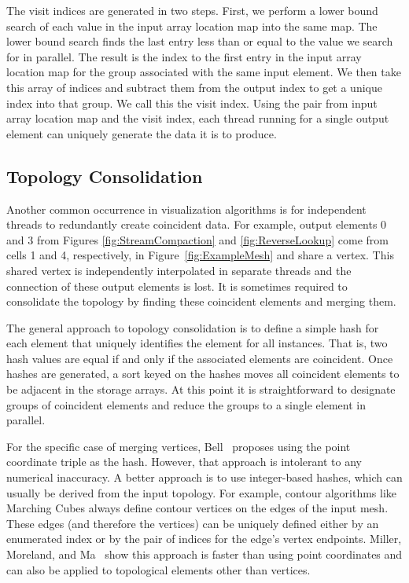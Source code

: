\documentclass{superfri}
\newcommand*{\scite}[1]{~\cite{#1}}
\begin{document}
The visit indices are generated in two steps. First, we perform a lower
bound search of each value in the input array location map into the same
map. The lower bound search finds the last entry less than or equal to the
value we search for in
parallel. The result is the index to the first entry in the input array
location map for the group associated with the same input element. We then
take this array of indices and subtract them from the output index to get a
unique index into that group. We call this the visit index. Using the pair
from input array location map and the visit index, each thread running for
a single output element can uniquely generate the data it is to produce.

\subsection{Topology Consolidation}

\noindent
Another common occurrence in visualization algorithms is for independent
threads to redundantly create coincident data. For example, output elements
0 and 3 from Figures \ref{fig:StreamCompaction} and \ref{fig:ReverseLookup}
come from cells 1 and 4, respectively, in Figure~\ref{fig:ExampleMesh} and
share a vertex. This shared vertex is independently interpolated in
separate threads and the connection of these output elements is lost. It is
sometimes required to consolidate the topology by finding these coincident
elements and merging them.

The general approach to topology consolidation is to define a simple hash
for each element that uniquely identifies the element for all instances.
That is, two hash values are equal if and only if the associated elements
are coincident. Once hashes are generated, a sort keyed on the hashes moves
all coincident elements to be adjacent in the storage arrays. At this point
it is straightforward to designate groups of coincident
elements and reduce the groups to a single element in parallel.

For the specific case of merging vertices, Bell\scite{Bell2010} proposes
using the point coordinate triple as the hash. However, that approach is
intolerant to any numerical inaccuracy. A better approach is to use
integer-based hashes, which can usually be derived from the input topology.
For example, contour algorithms like Marching Cubes always define contour
vertices on the edges of the input mesh. These edges (and therefore the
vertices) can be uniquely defined either by an enumerated index or by the
pair of indices for the edge's vertex endpoints. Miller, Moreland, and
Ma\scite{Miller2014} show this approach is faster than using point
coordinates and can also be applied to topological elements other than
vertices.
\end{document}
